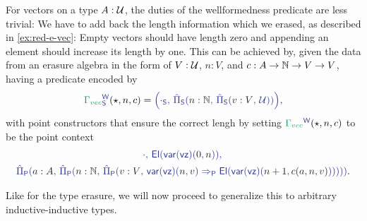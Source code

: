 \begin{example}[Vectors]\label{ex:red-w-vec}
For vectors on a type $A : \mathcal{U}$, the duties of the wellformedness predicate are less trivial:
We have to add back the length information which we erased, as described in
\ref{ex:red-e-vec}:
Empty vectors should have length zero and appending an element should increase its
length by one.
This can be achieved by, given the data from an erasure algebra in the form of
$V : \mathcal{U}$, $n: V$, and $c : A \to \mathbb{N} \to V \to V$,
having a predicate encoded by
\begin{equation*}
\tqm{\grm{\Gamma_{vec}}^\WW_\Sc}(\star, n, c)
  = \tqm{\left(\cdot_\Sc,\, \ExtPiS{n : \N}{\ExtPiS{v : V}{\UU}} \right)} \text{,}
\end{equation*}
with point constructors that ensure the correct lengh by setting $\tqm{\grm{\Gamma_{vec}}^\WW}(\star, n, c)$ to be the point context
\begin{equation*}
\begin{gathered}
\tqm{\cdot,\, \El(\var(\vz)(\blm{0}, \blm{n})),\,} \\
\tqm{\ExtPiP{a: A}{\ExtPiP{n : \N}{\ExtPiP{v : V}{\var(\vz)(\blm{n}, \blm{v}) \Rightarrow_\Pc 
  \El(\var(\vz)(\blm{n + 1}, \blm{c(a, n, v)}) ) } } } } \text{.}
\end{gathered}
\end{equation*}
\end{example}

Like for the type erasure, we will now proceed to generalize this to arbitrary
inductive-inductive types.

